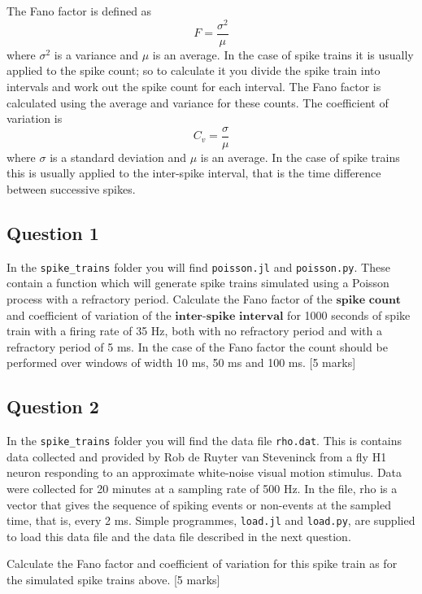 \documentclass[12pt]{article}
\begin{document}
The Fano factor is defined as
\begin{equation}
F=\frac{\sigma^2}{\mu}
\end{equation}
where $\sigma^2$ is a variance and $\mu$ is an average.  In the
case of spike trains it is usually applied to the spike count; so to
calculate it you divide the spike train into intervals and work out
the spike count for each interval. The Fano factor is calculated using
the average and variance for these counts. The coefficient of variation is 
\begin{equation}
C_v=\frac{\sigma}{\mu}
\end{equation}
where $\sigma$ is a standard deviation and $\mu$ is an average. In the
case of spike trains this is usually applied to the inter-spike
interval, that is the time difference between successive spikes.

\subsection*{Question 1}

In the \texttt{spike\_trains} folder you will find
\texttt{poisson.jl} and \texttt{poisson.py}. These contain a function
which will generate spike trains simulated using a Poisson process
with a refractory period. Calculate the Fano factor of the $\textbf{spike count}$
and coefficient of variation of the $\textbf{inter-spike interval}$ for 1000
seconds of spike train with a firing rate of 35 Hz, both with no
refractory period and with a refractory period of 5 ms. In the case of
the Fano factor the count should be performed over windows of width 10
ms, 50 ms and 100 ms. [5 marks]

\subsection*{Question 2}

In the \texttt{spike\_trains} folder you will find the data file
\texttt{rho.dat}. This is contains data collected and provided by Rob
de Ruyter van Steveninck from a fly H1 neuron responding to an
approximate white-noise visual motion stimulus. Data were collected
for 20 minutes at a sampling rate of 500 Hz. In the file, rho is a
vector that gives the sequence of spiking events or non-events at the
sampled time, that is, every 2 ms. Simple programmes, \texttt{load.jl}
and \texttt{load.py}, are supplied to load this data file and the data
file described in the next question.

Calculate the Fano factor and coefficient of variation for this spike
train as for the simulated spike trains above. [5 marks]
\end{document}

